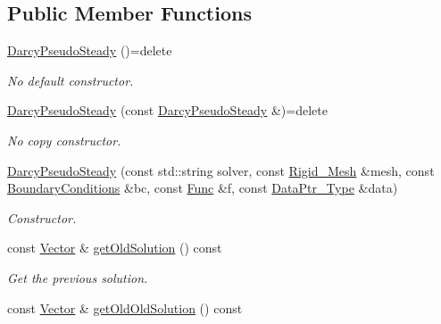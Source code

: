 \subsection*{Public Member Functions}
\begin{DoxyCompactItemize}
\item 
\hyperlink{classFVCode3D_1_1DarcyPseudoSteady_3_01QRMatrix_00_01QRFracture_00_01MatrixType_00_01BDF2_01_4_abfcd2e30e210a4ce5ad0b967610100b1}{Darcy\+Pseudo\+Steady} ()=delete
\begin{DoxyCompactList}\small\item\em No default constructor. \end{DoxyCompactList}\item 
\hyperlink{classFVCode3D_1_1DarcyPseudoSteady_3_01QRMatrix_00_01QRFracture_00_01MatrixType_00_01BDF2_01_4_a11db4560fc4ce8f4a7621132ecebbbad}{Darcy\+Pseudo\+Steady} (const \hyperlink{classFVCode3D_1_1DarcyPseudoSteady}{Darcy\+Pseudo\+Steady} \&)=delete
\begin{DoxyCompactList}\small\item\em No copy constructor. \end{DoxyCompactList}\item 
\hyperlink{classFVCode3D_1_1DarcyPseudoSteady_3_01QRMatrix_00_01QRFracture_00_01MatrixType_00_01BDF2_01_4_ac612f7bd7736d811ab8c461d8132bc92}{Darcy\+Pseudo\+Steady} (const std\+::string solver, const \hyperlink{classFVCode3D_1_1Rigid__Mesh}{Rigid\+\_\+\+Mesh} \&mesh, const \hyperlink{classFVCode3D_1_1BoundaryConditions}{Boundary\+Conditions} \&bc, const \hyperlink{namespaceFVCode3D_a38fa3b2520ad364d2c3d56ea5077826a}{Func} \&f, const \hyperlink{namespaceFVCode3D_a3d19a370a98afe491a9e17a646a9c56f}{Data\+Ptr\+\_\+\+Type} \&data)
\begin{DoxyCompactList}\small\item\em Constructor. \end{DoxyCompactList}\item 
const \hyperlink{namespaceFVCode3D_a16ccf345652402bccd1a5d2e6782526c}{Vector} \& \hyperlink{classFVCode3D_1_1DarcyPseudoSteady_3_01QRMatrix_00_01QRFracture_00_01MatrixType_00_01BDF2_01_4_aacb6b3322847d530d28565f03a41719f}{get\+Old\+Solution} () const 
\begin{DoxyCompactList}\small\item\em Get the previous solution. \end{DoxyCompactList}\item 
const \hyperlink{namespaceFVCode3D_a16ccf345652402bccd1a5d2e6782526c}{Vector} \& \hyperlink{classFVCode3D_1_1DarcyPseudoSteady_3_01QRMatrix_00_01QRFracture_00_01MatrixType_00_01BDF2_01_4_a6cfbde96f2bbff056eb110245d82874e}{get\+Old\+Old\+Solution} () const 

\end{DoxyCompactItemize}
